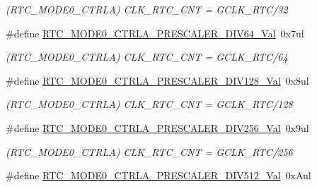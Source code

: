 \begin{DoxyCompactItemize}
\begin{DoxyCompactList}\small\item\em (R\+T\+C\+\_\+\+M\+O\+D\+E0\+\_\+\+C\+T\+R\+L\+A) C\+L\+K\+\_\+\+R\+T\+C\+\_\+\+C\+N\+T = G\+C\+L\+K\+\_\+\+R\+T\+C/32 \end{DoxyCompactList}\item 
\hypertarget{group___s_a_m_l21___r_t_c_gaa32300dbb23ae91a202b4ac7ec93890a}{}\#define \hyperlink{group___s_a_m_l21___r_t_c_gaa32300dbb23ae91a202b4ac7ec93890a}{R\+T\+C\+\_\+\+M\+O\+D\+E0\+\_\+\+C\+T\+R\+L\+A\+\_\+\+P\+R\+E\+S\+C\+A\+L\+E\+R\+\_\+\+D\+I\+V64\+\_\+\+Val}~0x7ul\label{group___s_a_m_l21___r_t_c_gaa32300dbb23ae91a202b4ac7ec93890a}

\begin{DoxyCompactList}\small\item\em (R\+T\+C\+\_\+\+M\+O\+D\+E0\+\_\+\+C\+T\+R\+L\+A) C\+L\+K\+\_\+\+R\+T\+C\+\_\+\+C\+N\+T = G\+C\+L\+K\+\_\+\+R\+T\+C/64 \end{DoxyCompactList}\item 
\hypertarget{group___s_a_m_l21___r_t_c_ga23ef8b1e57fbbbfa3b245d49f7c6a771}{}\#define \hyperlink{group___s_a_m_l21___r_t_c_ga23ef8b1e57fbbbfa3b245d49f7c6a771}{R\+T\+C\+\_\+\+M\+O\+D\+E0\+\_\+\+C\+T\+R\+L\+A\+\_\+\+P\+R\+E\+S\+C\+A\+L\+E\+R\+\_\+\+D\+I\+V128\+\_\+\+Val}~0x8ul\label{group___s_a_m_l21___r_t_c_ga23ef8b1e57fbbbfa3b245d49f7c6a771}

\begin{DoxyCompactList}\small\item\em (R\+T\+C\+\_\+\+M\+O\+D\+E0\+\_\+\+C\+T\+R\+L\+A) C\+L\+K\+\_\+\+R\+T\+C\+\_\+\+C\+N\+T = G\+C\+L\+K\+\_\+\+R\+T\+C/128 \end{DoxyCompactList}\item 
\hypertarget{group___s_a_m_l21___r_t_c_gadf29384af5ecfe99cbd4a5574d52438b}{}\#define \hyperlink{group___s_a_m_l21___r_t_c_gadf29384af5ecfe99cbd4a5574d52438b}{R\+T\+C\+\_\+\+M\+O\+D\+E0\+\_\+\+C\+T\+R\+L\+A\+\_\+\+P\+R\+E\+S\+C\+A\+L\+E\+R\+\_\+\+D\+I\+V256\+\_\+\+Val}~0x9ul\label{group___s_a_m_l21___r_t_c_gadf29384af5ecfe99cbd4a5574d52438b}

\begin{DoxyCompactList}\small\item\em (R\+T\+C\+\_\+\+M\+O\+D\+E0\+\_\+\+C\+T\+R\+L\+A) C\+L\+K\+\_\+\+R\+T\+C\+\_\+\+C\+N\+T = G\+C\+L\+K\+\_\+\+R\+T\+C/256 \end{DoxyCompactList}\item 
\hypertarget{group___s_a_m_l21___r_t_c_gaa8e3801e4c7a53b5c6f9843391199140}{}\#define \hyperlink{group___s_a_m_l21___r_t_c_gaa8e3801e4c7a53b5c6f9843391199140}{R\+T\+C\+\_\+\+M\+O\+D\+E0\+\_\+\+C\+T\+R\+L\+A\+\_\+\+P\+R\+E\+S\+C\+A\+L\+E\+R\+\_\+\+D\+I\+V512\+\_\+\+Val}~0x\+Aul\label{group___s_a_m_l21___r_t_c_gaa8e3801e4c7a53b5c6f9843391199140}


\end{DoxyCompactItemize}
